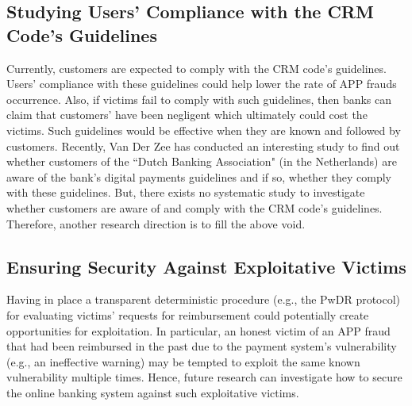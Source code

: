 \subsection{Studying Users' Compliance with the CRM Code's Guidelines}

Currently,   customers are expected to comply with the CRM code's guidelines.  Users'  compliance with these guidelines could help lower the rate of APP frauds occurrence.  Also, if victims fail to comply with such guidelines, then banks can claim that customers' have been negligent which ultimately could cost the victims. Such guidelines would be effective when they are known and followed by customers. Recently, Van Der Zee \cite{zee2021shifting}  has conducted an interesting study to find out whether customers of the ``Dutch Banking Association" (in the Netherlands) are aware of the bank's digital payments guidelines and if so, whether they comply with these guidelines.  But, there exists no systematic study to investigate whether customers are aware of and comply with the CRM code's guidelines. Therefore, another research direction is to fill the above void. 



\subsection{Ensuring Security Against Exploitative Victims}



Having in place a transparent deterministic procedure (e.g.,  the PwDR protocol)  for evaluating victims' requests for reimbursement could potentially create opportunities for exploitation. In particular, an honest victim of an APP fraud that had been reimbursed in the past due to the payment system's vulnerability (e.g., an ineffective warning) may be tempted to exploit the same known vulnerability multiple times. Hence, future research can investigate how to secure the online banking system against such exploitative victims.











